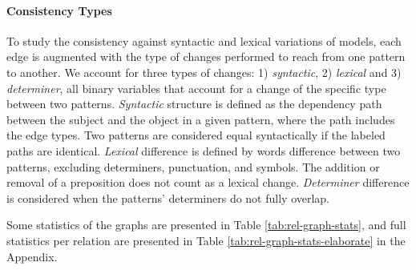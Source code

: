 \paragraph{Consistency Types}
To study the consistency against syntactic and lexical variations of models, each edge is augmented with the type of changes performed to reach from one pattern to another. We account for three types of changes: 1) \textit{syntactic}, 2) \textit{lexical} and 3) \textit{determiner}, all binary variables that account for a change of the specific type between two patterns.
\textit{Syntactic} structure is defined as the dependency path between the subject and the object in a given pattern, where the path includes the edge types. Two patterns are considered equal syntactically if the labeled paths are identical.
\textit{Lexical} difference is defined by words difference between two patterns, excluding determiners, punctuation, and symbols. The addition or removal of a preposition does not count as a lexical change.
\textit{Determiner} difference is considered when the patterns' determiners do not fully overlap.


Some statistics of the graphs are presented in Table \ref{tab:rel-graph-stats}, and full statistics per relation are presented in Table \ref{tab:rel-graph-stats-elaborate} in the Appendix.



% 


